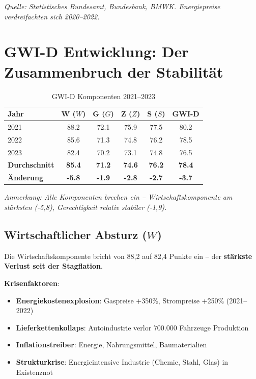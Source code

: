 \begin{flushleft}
\footnotesize{\textit{Quelle: Statistisches Bundesamt, Bundesbank, BMWK. Energiepreise verdreifachten sich 2020–2022.}}
\end{flushleft}

\section{GWI-D Entwicklung: Der Zusammenbruch der Stabilität}

\begin{table}[ht]
    \centering
    \caption{GWI-D Komponenten 2021–2023}
    \label{tab:gwi_multikrise}
    \begin{tabular}{lccccc}
        \toprule
        \textbf{Jahr} & \textbf{W (\(W\))} & \textbf{G (\(G\))} & \textbf{Z (\(Z\))} & \textbf{S (\(S\))} & \textbf{GWI-D} \\
        \midrule
        2021 & 88.2 & 72.1 & 75.9 & 77.5 & 80.2 \\
        2022 & 85.6 & 71.3 & 74.8 & 76.2 & 78.5 \\
        2023 & 82.4 & 70.2 & 73.1 & 74.8 & 76.5 \\
        \midrule
        \textbf{Durchschnitt} & \textbf{85.4} & \textbf{71.2} & \textbf{74.6} & \textbf{76.2} & \textbf{78.4} \\
        \textbf{Änderung} & \textbf{-5.8} & \textbf{-1.9} & \textbf{-2.8} & \textbf{-2.7} & \textbf{-3.7} \\
        \bottomrule
    \end{tabular}
\end{table}

\begin{flushleft}
\footnotesize{\textit{Anmerkung: Alle Komponenten brechen ein – Wirtschaftskomponente am stärksten (-5,8), Gerechtigkeit relativ stabiler (-1,9).}}
\end{flushleft}

\subsection{Wirtschaftlicher Absturz (\(W\))}

Die Wirtschaftskomponente bricht von 88,2 auf 82,4 Punkte ein – der \textbf{stärkste Verlust seit der Stagflation}.

\textbf{Krisenfaktoren}:
\begin{itemize}
    \item \textbf{Energiekostenexplosion}: Gaspreise +350\%, Strompreise +250\% (2021–2022)
    \item \textbf{Lieferkettenkollaps}: Autoindustrie verlor 700.000 Fahrzeuge Produktion
    \item \textbf{Inflationstreiber}: Energie, Nahrungsmittel, Baumaterialien
    \item \textbf{Strukturkrise}: Energieintensive Industrie (Chemie, Stahl, Glas) in Existenznot
\end{itemize}

